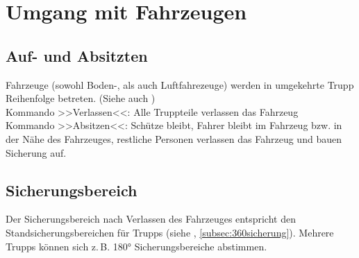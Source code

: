 \pagebreak
\section{Umgang mit Fahrzeugen}
\subsection{Auf- und Absitzten}
Fahrzeuge (sowohl Boden-, als auch Luftfahrezeuge) werden in umgekehrte Trupp Reihenfolge betreten. (Siehe auch )\\

Kommando >>Verlassen<<: Alle Truppteile verlassen das Fahrzeug \\
Kommando >>Absitzen<<: Schütze bleibt, Fahrer bleibt im Fahrzeug bzw. in der Nähe des Fahrzeuges, restliche Personen verlassen das Fahrzeug und bauen Sicherung auf.

\subsection{Sicherungsbereich}
Der Sicherungsbereich nach Verlassen des Fahrzeuges entspricht den Standsicherungsbereichen für  Trupps (siehe , \autoref{subsec:360sicherung}). Mehrere Trupps können sich z.\,B. 180° Sicherungsbereiche abstimmen. \\

